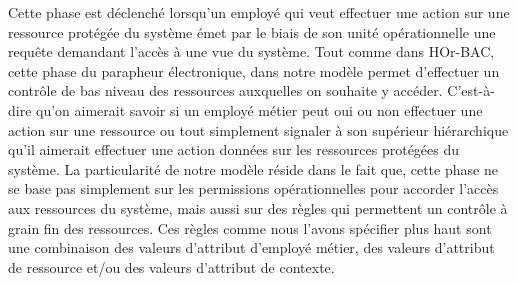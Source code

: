 

\label{sectionPhaseEmission}


Cette phase est déclenché lorsqu'un employé qui veut effectuer une action sur une ressource protégée du système émet par le biais de son unité opérationnelle une requête demandant l'accès à une vue du système. Tout comme dans HOr-BAC, cette phase du parapheur électronique, dans notre modèle permet d'effectuer un contrôle de bas niveau des ressources auxquelles on souhaite y accéder. C'est-à-dire qu'on aimerait savoir si un employé métier peut oui ou non effectuer une action sur une ressource ou tout simplement signaler à son supérieur hiérarchique qu'il aimerait effectuer une action données sur les ressources protégées du système. La particularité de notre modèle réside dans le fait que, cette phase ne se base pas simplement sur les permissions opérationnelles pour accorder l'accès aux ressources du système, mais aussi sur des règles qui permettent un contrôle à grain fin des ressources. Ces règles comme nous l'avons spécifier plus haut sont une combinaison des valeurs d'attribut d'employé métier, des valeurs d'attribut de ressource et/ou des valeurs d'attribut de contexte. 

